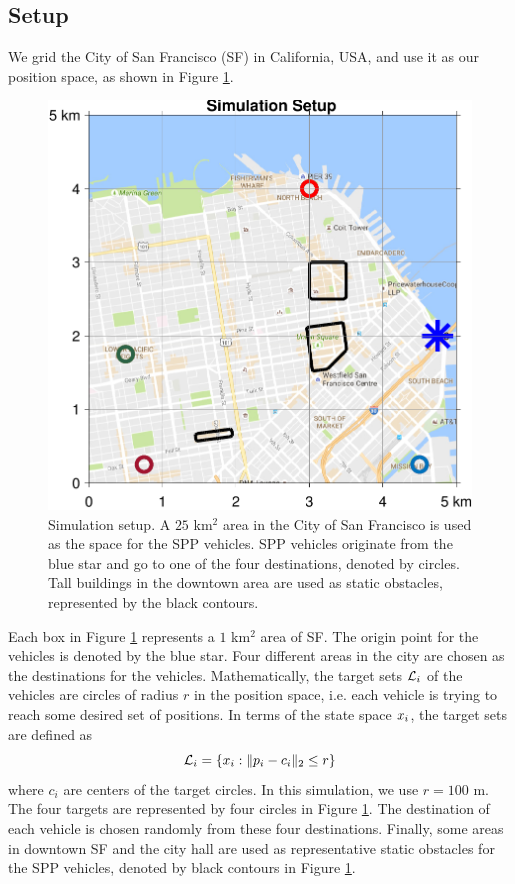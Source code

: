 \subsection{Setup \label{sec:city_simSetup}}
We grid the City of San Francisco (SF) in California, USA, and use it as our position space, as shown in Figure \ref{fig:sf_setup}. 
\begin{figure}[H]
  \centering
  \includegraphics[width=\columnwidth]{figs/sf_setup}
  \caption{Simulation setup. A $25$ km$^2$ area in the City of San Francisco is used as the space for the SPP vehicles. SPP vehicles originate from the blue star and go to one of the four destinations, denoted by circles. Tall buildings in the downtown area are used as static obstacles, represented by the black contours.}
  \label{fig:sf_setup}
\end{figure}
Each box in Figure \ref{fig:sf_setup} represents a $1$ km$^2$ area of SF. The origin point for the vehicles is denoted by the blue star. Four different areas in the city are chosen as the destinations for the vehicles. Mathematically, the target sets $\mathcal{L}_i$ of the vehicles are circles of radius $r$ in the position space, i.e. each vehicle is trying to reach some desired set of positions. In terms of the state space $x_i$, the target sets are defined as
\begin{equation}
\label{eq:target_sim}
\mathcal{L}_i = \{x_i: \|p_i - c_i\|_2 \le r\}
\end{equation}
\noindent where $c_i$ are centers of the target circles. In this simulation, we use $r = 100$ m. The four targets are represented by four circles in Figure \ref{fig:sf_setup}. The destination of each vehicle is chosen randomly from these four destinations. Finally, some areas in downtown SF and the city hall are used as representative static obstacles for the SPP vehicles, denoted by black contours in Figure \ref{fig:sf_setup}.

